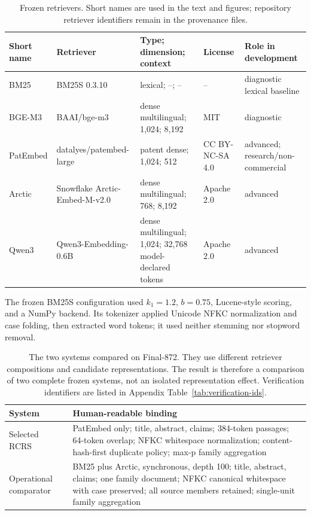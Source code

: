 \documentclass[final,5p,times,twocolumn]{elsarticle}
\newenvironment{widejournal}{\begin{table}[!t]}{\end{table}}
\newcommand{\journalTableFont}{\footnotesize}
\newenvironment{widejournal}{\begin{table}[!htbp]}{\end{table}}
\newcommand{\journalTableFont}{\footnotesize}
\begin{document}
\begin{widejournal}
\caption{Frozen retrievers. Short names are used in the text and figures;
repository retriever identifiers remain in the provenance files.}
\label{tab:retrievers}
\centering
\journalTableFont
\renewcommand{\arraystretch}{0.96}
\begin{tabularx}{\textwidth}{@{}P{1.65cm}P{2.75cm}P{2.9cm}P{2.0cm}Y@{}}
\toprule
Short name & Retriever & Type; dimension; context & License & Role in development \\
\midrule
BM25 & BM25S 0.3.10 & lexical; --; -- & -- & diagnostic lexical baseline
\cite{bm25review2009} \\
BGE-M3 & BAAI/bge-m3 & dense multilingual; 1,024; 8,192 & MIT & diagnostic
\cite{bgem3} \\
PatEmbed & datalyes/\allowbreak patembed-large & patent dense; 1,024; 512 &
CC BY-NC-SA 4.0 & advanced; research/non-commercial \\
Arctic & Snowflake Arctic-Embed-M-v2.0 & dense multilingual; 768; 8,192 &
Apache 2.0 & advanced \cite{arcticembed} \\
Qwen3 & Qwen3-Embedding-0.6B & dense multilingual; 1,024; 32,768 model-declared tokens &
Apache 2.0 & advanced \cite{qwen3embedding} \\
\bottomrule
\end{tabularx}
\end{widejournal}

The frozen BM25S configuration used $k_1=1.2$, $b=0.75$, Lucene-style
scoring, and a NumPy backend. Its tokenizer applied Unicode NFKC normalization
and case folding, then extracted word tokens; it used neither stemming nor
stopword removal.

\begin{widejournal}
\caption{The two systems compared on Final-872. They use different retriever
compositions and candidate representations. The result is therefore a
comparison of two complete frozen systems, not an isolated representation
effect. Verification identifiers are listed in Appendix
Table~\ref{tab:verification-ids}.}
\label{tab:frozen-systems}
\centering
\journalTableFont
\begin{tabularx}{\textwidth}{@{}P{3.0cm}Y@{}}
\toprule
System & Human-readable binding \\
\midrule
Selected RCRS & PatEmbed only; title, abstract, claims; 384-token passages; 64-token overlap; NFKC whitespace normalization; content-hash-first duplicate policy; max-p family aggregation \\
Operational comparator & BM25 plus Arctic, synchronous, depth 100; title, abstract, claims; one family document; NFKC canonical whitespace with case preserved; all source members retained; single-unit family aggregation \\
\bottomrule
\end{tabularx}
\end{widejournal}
\end{document}
